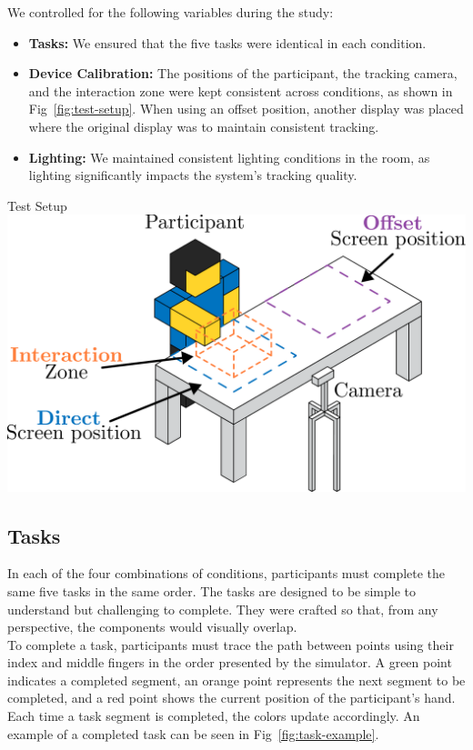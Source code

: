 We controlled for the following variables during the study:
\begin{itemize}[itemsep=-0.25em]
    \item \textbf{Tasks:} We ensured that the five tasks were identical in each condition.
    \item \textbf{Device Calibration:} The positions of the participant, the tracking camera, and the interaction zone were kept consistent across conditions, as shown in Fig~\ref{fig:test-setup}. When using an offset position, another display was placed where the original display was to maintain consistent tracking.
    \item \textbf{Lighting:} We maintained consistent lighting conditions in the room, as lighting significantly impacts the system's tracking quality.
\end{itemize}

\begin{figureBox}[label={fig:test-setup}, width=0.8\linewidth]{Test Setup}
    \includegraphics[width=0.8\linewidth]{./implementation/figures/test-setup.pdf}
\end{figureBox}

\subsection{Tasks}
In each of the four combinations of conditions, participants must complete the same five tasks in the same order. The tasks are designed to be simple to understand but challenging to complete. They were crafted so that, from any perspective, the components would visually overlap. \\

To complete a task, participants must trace the path between points using their index and middle fingers in the order presented by the simulator. A green point indicates a completed segment, an orange point represents the next segment to be completed, and a red point shows the current position of the participant's hand. Each time a task segment is completed, the colors update accordingly. An example of a completed task can be seen in Fig~\ref{fig:task-example}.

